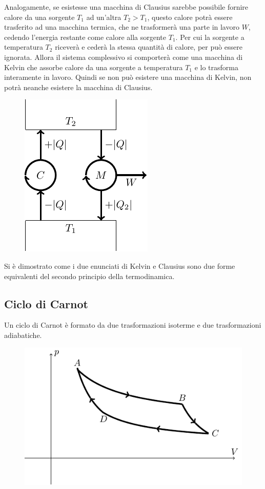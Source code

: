 \documentclass{article}
\numberwithin{equation}{subsection}
\begin{document}
Analogamente, se esistesse una macchina di Clausius sarebbe possibile 
fornire calore da una sorgente $T_1$ ad un'altra $T_2>T_1$, questo 
calore potrà essere trasferito ad una macchina termica, che ne trasformerà una 
parte in lavoro $W$, cedendo l'energia restante come calore alla sorgente $T_1$. 
Per cui la sorgente a temperatura $T_2$ riceverà e cederà la stessa quantità di calore, per può 
essere ignorata. Allora il sistema complessivo si comporterà come una macchina di Kelvin che 
assorbe calore da una sorgente a temperatura $T_1$ e lo trasforma interamente in lavoro. 
Quindi se non può esistere una 
macchina di Kelvin, non potrà neanche esistere la macchina di Clausius.

\begin{figure}[H]%
    \centering
    \includegraphics{secondo-principio-2.pdf}%
\end{figure}

Si è dimostrato come i due enunciati di Kelvin e Clausius sono due forme 
equivalenti del secondo principio della termodinamica. 

\subsection{Ciclo di Carnot}

Un ciclo di Carnot è formato da due trasformazioni isoterme e due 
trasformazioni adiabatiche.

\begin{figure}[H]%
    \centering
    \includegraphics{carnot-1.pdf}%
\end{figure}
\end{document}
